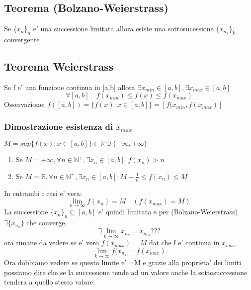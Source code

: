 \documentclass{article}
\begin{document}
        \subsection{Teorema (Bolzano-Weierstrass)}
        \begin{flushleft}
          Se $\{x_n\}_n$ e' una successione limitata allora esiste una sottosucessione $\{x_{n_{k}}\}_k$ convergente
        \end{flushleft}
        \subsection{Teorema Weierstrass}
        \begin{flushleft}
          Se f e' una funzione continua in [a,b] allora $\exists x_{min} \in [a,b],\exists x_{max} \in [a,b]$ 
          \begin{equation}
            \forall [a,b] \quad f(x_{min}) \leq f(x) \leq f(x_{max}) 
          \end{equation}
          Osservazione: $f([a,b])=\{f(x): x \in [a,b] \} = [f(x_{min},f(x_{max})]$
        \end{flushleft}
        \subsubsection{Dimostrazione esistenza di $x_{max}$}
        \begin{flushleft}
          $M=sup\{f(x):x \in [a,b] \} \in \mathbb{R} \cup \{-\infty,+\infty\}$
          \begin{enumerate}
            \item Se $M=+\infty,\forall n \in \mathbb{N}^+,\exists x_n \in [a,b],f(x_n)>n$
            \item Se $M= \mathbb{R},\forall n \in \mathbb{N}^+,\exists x_n \in [a,b]: M-\frac{1}{n} \leq f(x_n)\leq M$
          \end{enumerate}
          In entrambi i casi e' vera:
          \begin{equation}
            \lim_{n\to \infty} f(x_n)=M \quad (f(x_{max})=M) 
          \end{equation}
          La successione $\{x_n\}_n \subseteq [a,b]$ e' quindi limitata e per (Bolzano-Weierstrass) $\exists \{x_{n_{k}}\}$ che converge,
          \begin{equation}
            \exists \lim_{k \to \infty} x_{n_{k}}=x_{n_{0k}} ???
          \end{equation}
          ora rimane da vedere se e' vero $f(x_{max})=M$ dat che f e' continua in $x_{max}$ 
          \begin{equation}
            \lim_{k \to \infty} f(x_{n_{k}}=f(x_{max})
          \end{equation}
          Ora dobbiamo vedere se questo limite e' =M e grazie alla proprieta' dei limiti possiamo dire che se la successione tende ad un valore anche la
          sottosuccessione tendera a  quello stesso valore.
        \end{flushleft}
\end{document}
